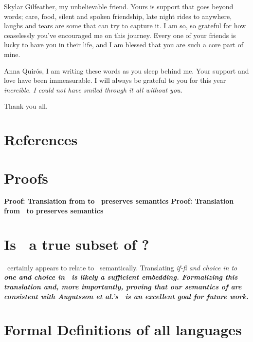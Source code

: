 \documentclass[manuscript,screen,review, 12pt, nonacm]{acmart}
\begin{document}
Skylar Gilfeather, my unbelievable friend. Yours is support that goes
beyond words; care, food, silent and spoken friendship, late night rides to
anywhere, laughs and tears are some that can try to capture it. I am so, so
grateful for how ceaselessly you've encouraged me on this journey. Every one
of your friends is lucky to have you in their life, and I am blessed that 
you are such a core part of mine. 

Anna Quirós, I am writing these words as you sleep behind me. Your support
and love have been immeasurable. I will always be grateful to you for this
year \it{increíble}. I could not have smiled through it all without you. 

Thank you all. 

\section{References}



\renewcommand\thesection{\Alph{section}}
\setcounter{section}{0}
\section{Proofs}
\begin{outline}
\1 \bf{Proof: Translation from \VMinus to \D\ preserves semantics }
\1 \bf{Proof: Translation from \PPlus\ to \VMinus preserves semantics }
\end{outline}

\section{Is \VMinus\ a true subset of \VC?}
\VMinus\ certainly appears to relate to \VC\ semantically. Translating
\it{if-fi} and choice in \VMinus to \bf{one} and choice in \VC\ is likely a
sufficient embedding. Formalizing this translation and, more importantly,
proving that our semantics of \VMinus are consistent with Augutsson et al.'s
\VC\ is an excellent goal for future work. 

\section{Formal Definitions of all languages}

\utable
\ppsemantics
\vmsemantics
\end{document}
